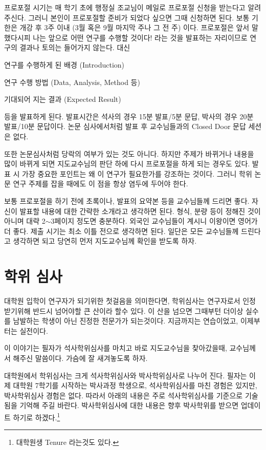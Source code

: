 프로포절 시기는 매 학기 초에 행정실 조교님이 메일로 프로포절 신청을 받는다고
알려주신다. 그러니 본인이 프로포절할 준비가 되었다 싶으면 그때 신청하면
된다. 보통 기한은 개강 후 3주 이내 (3월 혹은 9월 마지막 주나 그 전 주)
이다. 프로포절은 앞서 말했다시피 나는 앞으로 어떤 연구를 수행할 것이다! 라는 것을
발표하는 자리이므로 연구의 결과나 토의는 들어가지 않는다. 대신
\begin{packed_item}
\item 연구를 수행하게 된 배경 (Introduction)
\item 연구 수행 방법 (Data, Analysis, Method 등)
\item 기대되어 지는 결과 (Expected Result) 
\end{packed_item}
등을 발표하게 된다.  발표시간은 석사의 경우 15분 발표/5분 문답, 박사의 경우 20분
발표/10분 문답이다. 논문 심사에서처럼 발표 후 교수님들과의 Closed Door 문답
세션은 없다.

또한 논문심사처럼 당락의 여부가 있는 것도 아니다. 하지만 주제가 바뀌거나 내용을
많이 바뀌게 되면 지도교수님의 판단 하에 다시 프로포절을 하게 되는 경우도 있다.
발표 시 가장 중요한 포인트는 왜 이 연구가 필요한가를 강조하는 것이다. 그러니 학위
논문 연구 주제를 잡을 때에도 이 점을 항상 염두에 두어야 한다.

보통 프로포절을 하기 전에 초록이나, 발표의 요약본 등을 교수님들께 드리면
좋다. 자신이 발표할 내용에 대한 간략한 소개라고 생각하면 된다. 형식, 분량 등이
정해진 것이 아니며 대략 2$\sim$3페이지 정도면 충분하다. 외국인 교수님들이 계시니
이왕이면 영어가 더 좋다. 제출 시기는 최소 이틀 전으로 생각하면 된다. 일단은 모든
교수님들께 드린다고 생각하면 되고 당연히 먼저 지도교수님께 확인을 받도록 하자.

\section{학위 심사}
대학원 입학이 연구자가 되기위한 첫걸음을 의미한다면, 학위심사는 연구자로서
인정받기위해 반드시 넘어야할 큰 산이라 할수 있다. 이 산을 넘으면 그때부턴 더이상
실수를 남발하는 학생이 아닌 진정한 전문가가 되는것이다. 지금까지는 연습이었고,
이제부터는 실전이다.

이 이야기는 필자가 석사학위심사를 마치고 바로 지도교수님을 찾아갔을때, 교수님께서
해주신 말씀이다. 가슴에 잘 새겨놓도록 하자.
 
대학원에서 학위심사는 크게 석사학위심사와 박사학위심사로 나누어 진다. 필자는 이제
대학원 7학기를 시작하는 박사과정 학생으로, 석사학위심사를 마친 경험은 있지만,
박사학위심사 경험은 없다. 따라서 아래의 내용은 주로 석사학위심사를 기준으로
기술됨을 기억해 주길 바란다. 박사학위심사에 대한 내용은 향후 박사학위를 받으면
업데이트 하기로 하겠다.\footnote{대학원생 Tenure 라는것도 있다.}

